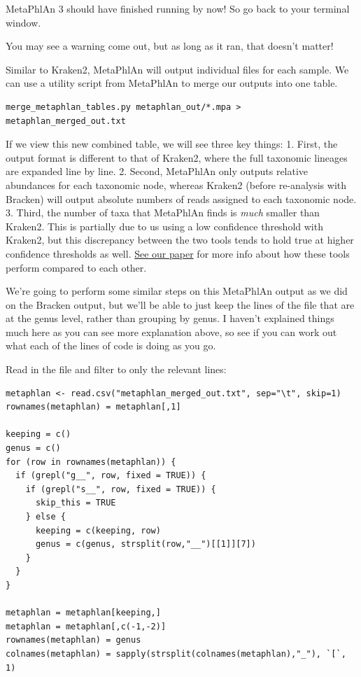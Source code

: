 \documentclass[
]{book}
\begin{document}
MetaPhlAn 3 should have finished running by now! So go back to your terminal window.

You may see a warning come out, but as long as it ran, that doesn't matter!

Similar to Kraken2, MetaPhlAn will output individual files for each sample. We can use a utility script from MetaPhlAn to merge our outputs into one table.

\begin{verbatim}
merge_metaphlan_tables.py metaphlan_out/*.mpa > metaphlan_merged_out.txt
\end{verbatim}

If we view this new combined table, we will see three key things:
1. First, the output format is different to that of Kraken2, where the full taxonomic lineages are expanded line by line.
2. Second, MetaPhlAn only outputs relative abundances for each taxonomic node, whereas Kraken2 (before re-analysis with Bracken) will output absolute numbers of reads assigned to each taxonomic node.
3. Third, the number of taxa that MetaPhlAn finds is \emph{much} smaller than Kraken2. This is partially due to us using a low confidence threshold with Kraken2, but this discrepancy between the two tools tends to hold true at higher confidence thresholds as well. \href{https://www.ncbi.nlm.nih.gov/pmc/articles/PMC10132073/\#:~:text=Classification\%20of\%20real\%20metagenome\%20datasets}{See our paper} for more info about how these tools perform compared to each other.

We're going to perform some similar steps on this MetaPhlAn output as we did on the Bracken output, but we'll be able to just keep the lines of the file that are at the genus level, rather than grouping by genus. I haven't explained things much here as you can see more explanation above, so see if you can work out what each of the lines of code is doing as you go.

Read in the file and filter to only the relevant lines:

\begin{verbatim}
metaphlan <- read.csv("metaphlan_merged_out.txt", sep="\t", skip=1)
rownames(metaphlan) = metaphlan[,1]

keeping = c()
genus = c()
for (row in rownames(metaphlan)) {
  if (grepl("g__", row, fixed = TRUE)) {
    if (grepl("s__", row, fixed = TRUE)) {
      skip_this = TRUE
    } else {
      keeping = c(keeping, row)
      genus = c(genus, strsplit(row,"__")[[1]][7])
    }
  }
}

metaphlan = metaphlan[keeping,]
metaphlan = metaphlan[,c(-1,-2)]
rownames(metaphlan) = genus
colnames(metaphlan) = sapply(strsplit(colnames(metaphlan),"_"), `[`, 1)
\end{verbatim}
\end{document}

